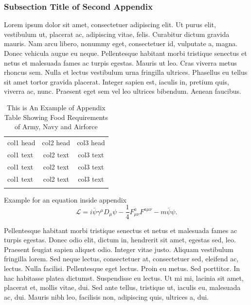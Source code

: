 \documentclass{wber}
\begin{document}
\subsubsection{Subsection Title of Second Appendix\label{app2.1.1a}}

Lorem ipsum dolor sit amet, consectetuer adipiscing elit. Ut purus elit, vestibulum ut, placerat ac, adipiscing vitae,
felis. Curabitur dictum gravida mauris. Nam arcu libero, nonummy eget, consectetuer id, vulputate a, magna. Donec
vehicula augue eu neque. Pellentesque habitant morbi tristique senectus et netus et malesuada fames ac turpis egestas.
Mauris ut leo. Cras viverra metus rhoncus sem. Nulla et lectus vestibulum urna fringilla ultrices. Phasellus eu tellus
sit amet tortor gravida placerat. Integer sapien est, iaculis in, pretium quis, viverra ac, nunc. Praesent eget sem vel
leo ultrices bibendum. Aenean faucibus.


\begin{table}[h]%
\centering
\tablefont
\caption{This is An Example of Appendix Table Showing Food Requirements of Army, Navy and Airforce\label{tab4}}%
\begin{tabular*}{\textwidth}{@{\extracolsep\fill}lcc@{\extracolsep\fill}}%
\toprule
{col1 head} & {col2 head} & {col3 head} \\
\colrule
col1 text & col2 text & col3 text \\
col1 text & col2 text & col3 text \\
col1 text & col2 text & col3 text\\
\botrule
\end{tabular*}
\end{table}

Example for an equation inside appendix
\begin{equation}
\mathbf{\mathcal{L}} = i \bar{\psi} \gamma^\mu D_\mu \psi - \frac{1}{4} F_{\mu\nu}^a F^{a\mu\nu} - m \bar{\psi} \psi.\label{eq25}
\end{equation}

Pellentesque habitant morbi tristique senectus et netus et malesuada fames ac turpis egestas. Donec odio elit,
dictum in, hendrerit sit amet, egestas sed, leo. Praesent feugiat sapien aliquet odio. Integer vitae justo. Aliquam
vestibulum fringilla lorem. Sed neque lectus, consectetuer at, consectetuer sed, eleifend ac, lectus. Nulla facilisi.
Pellentesque eget lectus. Proin eu metus. Sed porttitor. In hac habitasse platea dictumst. Suspendisse eu lectus. Ut
mi mi, lacinia sit amet, placerat et, mollis vitae, dui. Sed ante tellus, tristique ut, iaculis eu, malesuada ac, dui.
Mauris nibh leo, facilisis non, adipiscing quis, ultrices a, dui.



\end{document}
